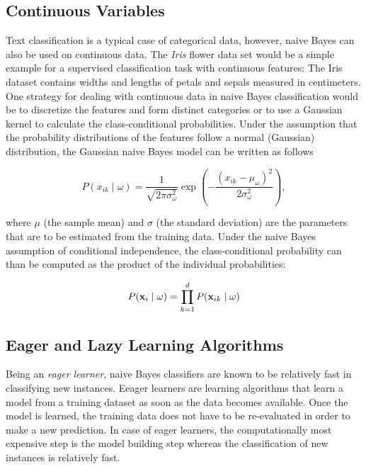 \documentclass{article}
\begin{document}
\subsection{Continuous Variables}
\label{sec:continuous_variables}

Text classification is a typical case of categorical data, however, naive Bayes can also be used on continuous data. The \emph{Iris} flower data set would be a simple example for a supervised classification task with continuous features: The Iris dataset contains widths and lengths of petals and sepals measured in centimeters.  One strategy for dealing with continuous data in naive Bayes classification would be to discretize the features and form distinct categories or to use a Gaussian kernel to calculate the class-conditional probabilities. Under the assumption that the probability distributions of the features  follow a normal  (Gaussian)  distribution, the Gaussian naive Bayes model can be written as follows

\begin{equation} P(x_{ik} \mid \omega) = \frac{1}{\sqrt{2\pi\sigma^2_{\omega}}} \exp\left(-\frac{(x_{ik} - \mu_{\omega})^2}{2\sigma^2_{\omega}}\right), \end{equation}

where $\mu$ (the sample mean) and $\sigma$ (the standard deviation) are the parameters that are to be estimated from the training data. Under the naive Bayes assumption of conditional independence, the class-conditional probability can than be computed as the product of the individual probabilities:


\begin{equation} P(\textbf x_i \mid \omega) = \prod_{k=1}^{d} P(\textbf x_{ik} \mid \omega) \end{equation}

\subsection{Eager and Lazy Learning Algorithms}
\label{sec:eager_and_lazy}

Being an \emph{eager learner}, naive Bayes classifiers are known to be relatively fast in classifying new instances. Eeager learners are learning algorithms that learn a model from a training dataset as soon as the data becomes available. Once the model is learned, the training data does not have to be re-evaluated in order to make a new prediction. In case of eager learners, the computationally most expensive step is the model building step whereas the classification of new instances is relatively fast.  
\end{document}
